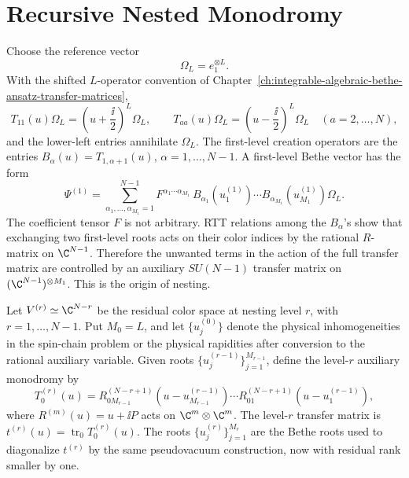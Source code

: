 \section{Recursive Nested Monodromy}

Choose the reference vector
\[
  \Omega_L=e_1^{\otimes L}.
\]
With the shifted \(L\)-operator convention of
Chapter~\ref{ch:integrable-algebraic-bethe-ansatz-transfer-matrices},
\[
  T_{11}(u)\Omega_L=\left(u+\frac{\ii}{2}\right)^L\Omega_L,
  \qquad
  T_{aa}(u)\Omega_L=\left(u-\frac{\ii}{2}\right)^L\Omega_L
  \quad(a=2,\ldots,N),
\]
and the lower-left entries annihilate \(\Omega_L\).  The first-level
creation operators are the entries \(B_\alpha(u)=T_{1,\alpha+1}(u)\),
\(\alpha=1,\ldots,N-1\).  A first-level Bethe vector has the form
\[
  \Psi^{(1)}
  =
  \sum_{\alpha_1,\ldots,\alpha_{M_1}=1}^{N-1}
  F^{\alpha_1\cdots\alpha_{M_1}}\,
  B_{\alpha_1}(u_1^{(1)})\cdots B_{\alpha_{M_1}}(u_{M_1}^{(1)})\Omega_L .
\]
The coefficient tensor \(F\) is not arbitrary.  RTT relations among the
\(B_\alpha\)'s show that exchanging two first-level roots acts on their color
indices by the rational \(R\)-matrix on \(\C^{N-1}\).  Therefore the
unwanted terms in the action of the full transfer matrix are controlled by
an auxiliary \(SU(N-1)\) transfer matrix on
\((\C^{N-1})^{\otimes M_1}\).  This is the origin of nesting.

\begin{construction}
\label{con:nested-auxiliary-monodromy}
Let \(V^{(r)}\simeq\C^{N-r}\) be the residual color space at nesting level
\(r\), with \(r=1,\ldots,N-1\).  Put \(M_0=L\), and let
\(\{u_j^{(0)}\}\) denote the physical inhomogeneities in the spin-chain
problem or the physical rapidities after conversion to the rational
auxiliary variable.  Given roots
\(\{u_j^{(r-1)}\}_{j=1}^{M_{r-1}}\), define the level-\(r\) auxiliary
monodromy by
\[
  T^{(r)}_0(u)
  =
  R^{(N-r+1)}_{0M_{r-1}}(u-u_{M_{r-1}}^{(r-1)})
  \cdots
  R^{(N-r+1)}_{01}(u-u_1^{(r-1)}),
\]
where \(R^{(m)}(u)=u+\ii P\) acts on \(\C^m\otimes\C^m\).  The level-\(r\)
transfer matrix is \(t^{(r)}(u)=\operatorname{tr}_0T^{(r)}_0(u)\).  The roots
\(\{u_j^{(r)}\}_{j=1}^{M_r}\) are the Bethe roots used to diagonalize
\(t^{(r)}\) by the same pseudovacuum construction, now with residual rank
smaller by one.
\end{construction}

